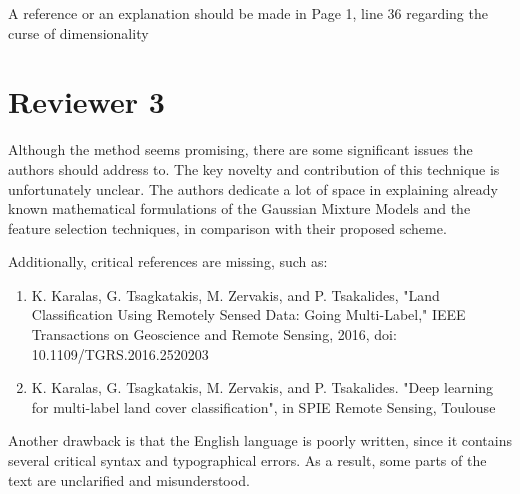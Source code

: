 \documentclass[a4paper,10pt,DIV=16]{scrartcl}
\begin{document}
\begin{revbox}
  A reference or an explanation should be made in Page 1, line 36 regarding the curse of dimensionality
  \begin{resbox}

  \end{resbox}
\end{revbox}

\section{Reviewer 3}


\begin{revbox}
  Although the method seems promising, there are some significant issues the authors should address to. The key novelty and contribution of this technique is unfortunately unclear. The authors dedicate a lot of space in explaining already known mathematical formulations of the Gaussian Mixture Models and the feature selection techniques, in comparison with their proposed scheme.
  \begin{resbox}

  \end{resbox}
\end{revbox}

\begin{revbox}
  Additionally, critical references are missing, such as:
  \begin{enumerate}
  \item K. Karalas, G. Tsagkatakis, M. Zervakis, and P. Tsakalides, "Land Classification Using Remotely Sensed Data: Going Multi-Label," IEEE Transactions on Geoscience and Remote Sensing, 2016, doi: 10.1109/TGRS.2016.2520203
  \item K. Karalas, G. Tsagkatakis, M. Zervakis, and P. Tsakalides. "Deep learning for multi-label land cover classification", in SPIE Remote Sensing, Toulouse
  \end{enumerate}

  \begin{resbox}

  \end{resbox}
\end{revbox}

\begin{revbox}
  Another drawback is that the English language is poorly written, since it contains several critical syntax and typographical errors. As a result, some parts of the text are unclarified and misunderstood.
  \begin{resbox}

  \end{resbox}
\end{revbox}
 
\end{document}
